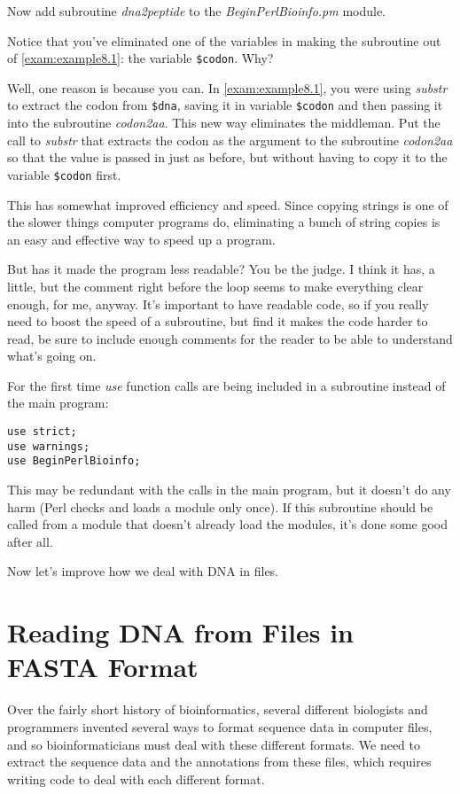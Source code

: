 Now add subroutine \textit{dna2peptide} to the \textit{BeginPerlBioinfo.pm} module.

Notice that you've eliminated one of the variables in making the subroutine out of \autoref{exam:example8.1}: the variable \verb|$codon|. Why?

Well, one reason is because you can. In \autoref{exam:example8.1}, you were using \textit{substr} to extract the codon from \verb|$dna|, saving it in variable \verb|$codon| and then passing it into the subroutine \textit{codon2aa}. This new way eliminates the middleman. Put the call to \textit{substr} that extracts the codon as the argument to the subroutine \textit{codon2aa} so that the value is passed in just as before, but without having to copy it to the variable \verb|$codon| first. 

This has somewhat improved efficiency and speed. Since copying strings is one of the slower things computer programs do, eliminating a bunch of string copies is an easy and effective way to speed up a program.

But has it made the program less readable? You be the judge. I think it has, a little, but the comment right before the loop seems to make everything clear enough, for me, anyway. It's important to have readable code, so if you really need to boost the speed of a subroutine, but find it makes the code harder to read, be sure to include enough comments for the reader to be able to understand what's going on.

For the first time \textit{use} function calls are being included in a subroutine instead of the main program:

\begin{lstlisting}
use strict;
use warnings;
use BeginPerlBioinfo;
\end{lstlisting}

This may be redundant with the calls in the main program, but it doesn't do any harm (Perl checks and loads a module only once). If this subroutine should be called from a module that doesn't already load the modules, it's done some good after all.

Now let's improve how we deal with DNA in files. 

\section{Reading DNA from Files in FASTA Format}
Over the fairly short history of bioinformatics, several different biologists and programmers invented several ways to format sequence data in computer files, and so bioinformaticians must deal with these different formats. We need to extract the sequence data and the annotations from these files, which requires writing code to deal with each different format.

